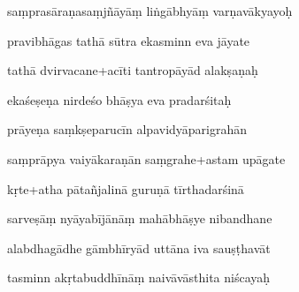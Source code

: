 \documentclass[article,12pt,a4paper]{memoir}%
\newcounter{parCount}
\begin{document}
	  
	  \pstart {} saṃprasāraṇasaṃjñāyāṃ liṅgābhyāṃ varṇavākyayoḥ 
	{}
	\pend%
      

	  
	  \pstart \leavevmode%
	pravibhāgas tathā sūtra ekasminn eva jāyate 
	{}
	\pend%
      

	  
	  \pstart {} tathā dvirvacane+acīti tantropāyād alakṣaṇaḥ 
	{}
	\pend%
      

	  
	  \pstart \leavevmode%
	ekaśeṣeṇa nirdeśo bhāṣya eva pradarśitaḥ 
	{}
	\pend%
      

	  
	  \pstart {} prāyeṇa saṃkṣeparucīn alpavidyāparigrahān 
	{}
	\pend%
      

	  
	  \pstart \leavevmode%
	saṃprāpya vaiyākaraṇān saṃgrahe+astam upāgate 
	{}
	\pend%
      

	  
	  \pstart {} kṛte+atha pātañjalinā guruṇā tīrthadarśinā 
	{}
	\pend%
      

	  
	  \pstart \leavevmode%
	sarveṣāṃ nyāyabījānāṃ mahābhāṣye nibandhane 
	{}
	\pend%
      

	  
	  \pstart {} alabdhagādhe gāmbhīryād uttāna iva sauṣṭhavāt 
	{}
	\pend%
      

	  
	  \pstart \leavevmode%
	tasminn akṛtabuddhīnāṃ naivāvāsthita niścayaḥ 
	{}
	\pend%
      
\end{document}

